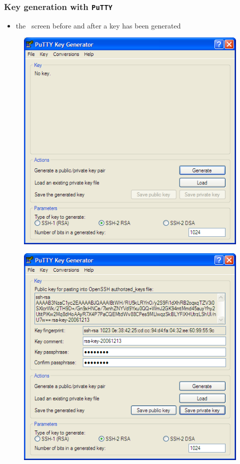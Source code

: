 \begin{frame}[fragile]
%
  \frametitle{Key generation with {\tt PuTTY}}
%
  \begin{itemize}
  \item the \putty\ screen before and after a key has been generated
  \end{itemize}

\vspace{.25in}
%
  \begin{minipage}{.45\linewidth}
    \begin{figure}
      \centering
      \includegraphics[scale=0.25]{figures/putty-initial.png}
    \end{figure}
  \end{minipage}
%
  \hfill
%
  \begin{minipage}{.45\linewidth}
    \begin{figure}
      \centering
      \includegraphics[scale=0.25]{figures/putty-key.png}

\end{figure}
\end{minipage}
\end{frame}
